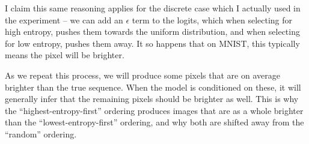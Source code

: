 I claim this same reasoning applies for the discrete case which I actually used in the experiment -- we can add an $\epsilon$ term to the logits, which when selecting for high entropy, pushes them towards the uniform distribution, and when selecting for low entropy, pushes them away. It so happens that on MNIST, this typically means the pixel will be brighter.

As we repeat this process, we will produce some pixels that are on average brighter than the true sequence. When the model is conditioned on these, it will generally infer that the remaining pixels should be brighter as well. This is why the ``highest-entropy-first'' ordering produces images that are as a whole brighter than the ``lowest-entropy-first'' ordering, and why both are shifted away from the ``random'' ordering.
